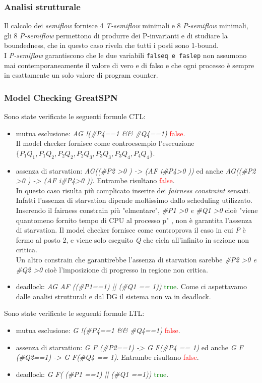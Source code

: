 \documentclass[a4paper]{article}
\begin{document}
\subsubsection{Analisi strutturale}
\label{SEC:3_8_strutturale}
Il calcolo dei \textit{semiflow} fornisce 4 \textit{T-semiflow} minimali e 8 \textit{P-semiflow} minimali, gli 8 \textit{P-semiflow} permettono di produrre dei P-invarianti e di studiare la boundedness, che in questo caso rivela che tutti i posti sono 1-bound.\\
I \textit{P-semiflow} garantiscono che le due variabili \texttt{falseq \texttt{e} faslep} non assumono mai contemporaneamente il valore di vero e di falso e che ogni processo è sempre in esattamente un solo valore di program counter.

\subsubsection{Model Checking GreatSPN}
Sono state verificate le seguenti formule CTL:
\begin{itemize}
	\item mutua esclusione: \textit{AG !(\#P4==1 \&\& \#Q4==1)} \textcolor{red}{false}.\\
		Il model checker fornisce come controesempio l'esecuzione \\$\{P_1 Q_1,P_1 Q_2,P_2 Q_2,P_2 Q_3,P_3 Q_3,P_3 Q_4,P_4 Q_4\}$.
	\item assenza di starvation: \textit{AG((\#P2 >0 ) -> (AF i\#P4>0 ))} ed anche \textit{AG((\#P2 >0 ) -> (AF i\#P4>0 ))}. Entrambe risultano \textcolor{red}{false}.\\
		In questo caso risulta più complicato inserire dei \textit{fairness constraint} sensati. Infatti l'assenza di starvation dipende moltissimo dallo scheduling utilizzato.  
		Inserendo il fairness constrain più "elmentare", \textit{\#P1 >0 \textit{e} \#Q1 >0} cioè "viene quantomeno fornito tempo di CPU al processo p" , non è garantita l'assenza di starvation. Il model checker fornisce come controprova il caso in cui \textit{P} è fermo al posto 2, e viene solo eseguito \textit{Q} che cicla all'infinito in sezione non critica.\\
		Un altro constrain che garantirebbe l'assenza di starvation sarebbe \textit{\#P2 >0 \textit{e} \#Q2 >0} cioè l'imposizione di progresso in regione non critica.%
	\item deadlock: \textit{AG AF ((\#P1==1) || (\#Q1 == 1))} \textcolor{green}{true}. Come ci aspettavamo dalle analisi strutturali e dal DG il sistema non va in deadlock.
\end{itemize}
Sono state verificate le seguenti formule LTL:
\begin{itemize}
	\item mutua esclusione: \textit{G !(\#P4==1 \&\& \#Q4==1)} \textcolor{red}{false}.
	\item assenza di starvation: \textit{G F (\#P2==1) -> G F(\#P4 == 1)} ed anche \textit{G F (\#Q2==1) -> G F(\#Q4 == 1)}. Entrambe risultano \textcolor{red}{false}.
	\item deadlock: \textit{G F( (\#P1 ==1) ||  (\#Q1 ==1))} \textcolor{green}{true}.
\end{itemize}
\end{document}
